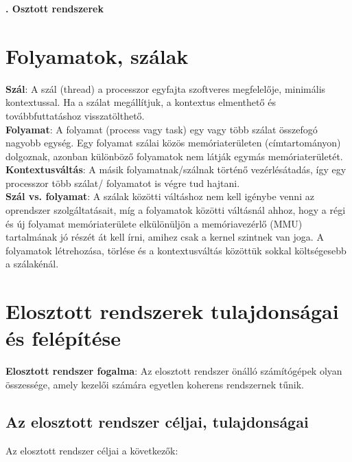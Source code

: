\documentclass[12pt]{article}
\begin{document}
    \thispagestyle{fancy}

    {\Large\bfseries{}. Osztott rendszerek} \\
	
	\section{Folyamatok, szálak}
	
	\noindent \textbf{Szál}: A szál (thread) a processzor egyfajta szoftveres megfelelője, minimális kontextussal. Ha a szálat
	megállítjuk, a kontextus elmenthető és továbbfuttatáshoz visszatölthető.\\
	
	\noindent \textbf{Folyamat}: A folyamat (process vagy task) egy vagy több szálat összefogó nagyobb egység. Egy folyamat
	szálai közös memóriaterületen (címtartományon) dolgoznak, azonban különböző folyamatok nem látják egymás memóriaterületét.\\
	
	\noindent \textbf{Kontextusváltás}: A másik folyamatnak/szálnak történő vezérlésátadás, így egy processzor több szálat/ folyamatot
	is végre tud hajtani.\\
	
	\noindent \textbf{Szál vs. folyamat}: A szálak közötti váltáshoz nem kell igénybe venni az oprendszer szolgáltatásait, míg
	a folyamatok közötti váltásnál ahhoz, hogy a régi és új folyamat memóriaterülete elkülönüljön a memóriavezérlő (MMU)
	tartalmának jó részét át kell írni, amihez csak a kernel szintnek van joga. A folyamatok létrehozása, törlése és a kontextusváltás
	közöttük sokkal költségesebb a szálakénál.
	
	\section{Elosztott rendszerek tulajdonságai és felépítése}
	
	\noindent \textbf{Elosztott rendszer fogalma}: Az elosztott rendszer önálló számítógépek olyan összessége, amely kezelői számára
	egyetlen koherens rendszernek tűnik.

	\subsection{Az elosztott rendszer céljai, tulajdonságai}
	
	Az elosztott rendszer céljai a következők:
	
\end{document}
